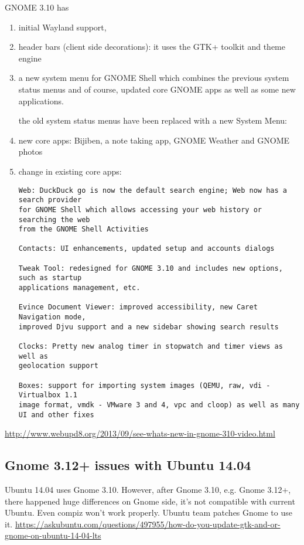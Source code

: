 GNOME 3.10 has
\begin{enumerate}
  \item  initial Wayland support, 
  
  \item header bars (client side decorations): it uses the GTK+ toolkit and
  theme engine
  
  \item a new  system menu for GNOME Shell which combines the previous system status menus
  and of course, updated core GNOME apps as well as some new applications.  

  the old system status menus have been replaced with a new System Menu: 

  \item new core apps: 
  Bijiben, a note taking app, GNOME Weather and GNOME photos
  
  \item change in existing core apps:
  
\begin{verbatim}
Web: DuckDuck go is now the default search engine; Web now has a search provider
for GNOME Shell which allows accessing your web history or searching the web
from the GNOME Shell Activities  

Contacts: UI enhancements, updated setup and accounts dialogs

Tweak Tool: redesigned for GNOME 3.10 and includes new options, such as startup
applications management, etc.  

Evince Document Viewer: improved accessibility, new Caret Navigation mode,
improved Djvu support and a new sidebar showing search results  

Clocks: Pretty new analog timer in stopwatch and timer views as well as
geolocation support 

Boxes: support for importing system images (QEMU, raw, vdi - Virtualbox 1.1
image format, vmdk - VMware 3 and 4, vpc and cloop) as well as many UI and other fixes 
\end{verbatim}
  
\end{enumerate}
\url{http://www.webupd8.org/2013/09/see-whats-new-in-gnome-310-video.html}

\subsection{Gnome 3.12+ issues with Ubuntu 14.04}
\label{sec:GNOME-3.12}

Ubuntu 14.04 uses Gnome 3.10.  However, after Gnome 3.10, e.g. Gnome 3.12+,
there happened huge differences on Gnome side, it's not compatible with current
Ubuntu. Even compiz won't work properly. Ubuntu team patches Gnome to use it.
\url{https://askubuntu.com/questions/497955/how-do-you-update-gtk-and-or-gnome-on-ubuntu-14-04-lts}


